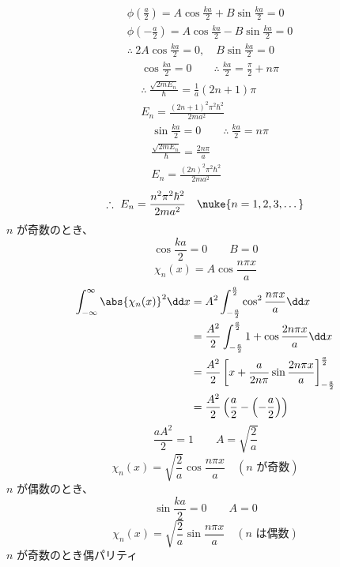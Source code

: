 \begin{align*}
&\phi\left(\frac{a}{2}\right)=A\cos\frac{ka}{2}+B\sin\frac{ka}{2}=0\\
&\phi\left(-\frac{a}{2}\right)=A\cos\frac{ka}{2}-B\sin\frac{ka}{2}=0\\
&\therefore\ 2A\cos\frac{ka}{2}=0,\quad B\sin\frac{ka}{2}=0
\end{align*}
\begin{align*}
&\cos\frac{ka}{2}=0\qquad\therefore\ \frac{ka}{2}=\frac{\pi}{2}+n\pi\\
&\therefore\ \frac{\sqrt{2mE_{n}}}{\hbar}=\frac{1}{a}(2n+1)\pi\\
&E_{n}=\frac{(2n+1)^{2}\pi^{2}\hbar^{2}}{2ma^{2}}
\end{align*}
\begin{align*}
&\sin\frac{ka}{2}=0\qquad\therefore\ \frac{ka}{2}=n\pi\\
&\frac{\sqrt{2mE_{n}}}{\hbar}=\frac{2n\pi}{a}\\
&E_{n}=\frac{(2n)^{2}\pi^{2}\hbar^{2}}{2ma^{2}}
\end{align*}
\[ \therefore\ E_{n}=\frac{n^{2}\pi^{2}\hbar^{2}}{2ma^{2}}\quad\nuke{n=1,2,3,\dots} \]
$n$ が奇数のとき、
\[ \cos\frac{ka}{2}=0\qquad B=0 \]
\[ \chi_{n}(x)=A\cos\frac{n\pi x}{a} \]
\begin{align*}
\int_{-\infty}^{\infty}\abs{\chi_{n}(x)}^{2}\dd x&=A^{2}\int_{-\frac{a}{2}}^{\frac{a}{2}}\cos^{2}\frac{n\pi x}{a}\dd x\\
&=\frac{A^{2}}{2}\int_{-\frac{a}{2}}^{\frac{a}{2}}1+\cos\frac{2n\pi x}{a}\dd x\\
&=\frac{A^{2}}{2}\left[x+\frac{a}{2n\pi}\sin\frac{2n\pi x}{a}\right]_{-\frac{a}{2}}^{\frac{a}{2}}\\
&=\frac{A^{2}}{2}\left(\frac{a}{2}-\left(-\frac{a}{2}\right)\right)
\end{align*}
\[ \frac{aA^{2}}{2}=1\qquad A=\sqrt{\frac{2}{a}} \]
\[ \chi_{n}(x)=\sqrt{\frac{2}{a}}\cos\frac{n\pi x}{a}\quad(\text{$n$ が奇数}) \]
$n$ が偶数のとき、
\[ \sin\frac{ka}{2}=0\qquad A=0 \]
\[ \chi_{n}(x)=\sqrt{\frac{2}{a}}\sin\frac{n\pi x}{a}\quad(\text{$n$ は偶数}) \]
$n$ が奇数のとき偶パリティ

